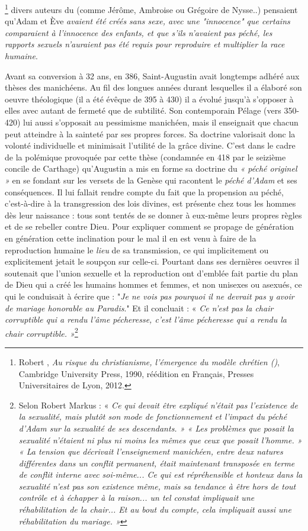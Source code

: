 \footnote{Robert , \emph{Au risque du christianisme, l'émergence du modèle chrétien ()}, Cambridge University Press, 1990, réédition en Français, Presses Universitaires de Lyon, 2012.} 
divers auteurs du  (comme Jérôme, Ambroise ou Grégoire de Nysse..) pensaient qu'Adam et Ève \emph{avaient été créés sans sexe, avec une "innocence" que certains comparaient à l'innocence des enfants, et que s'ils n'avaient pas péché, les rapports sexuels n'auraient pas été requis pour reproduire et multiplier la race humaine}.

 Avant sa conversion à 32 ans, en 386, Saint-Augustin avait longtemps adhéré aux thèses des manichéens. Au fil des longues années durant lesquelles il a élaboré son oeuvre théologique (il a été évêque de 395 à 430) il a évolué jusqu'à s'opposer à elles avec autant de fermeté que de subtilité. Son contemporain Pélage (vers 350-420) lui aussi s'opposait au pessimisme manichéen, mais il enseignait que chacun peut atteindre à la sainteté par ses propres forces. Sa doctrine valorisait donc la volonté individuelle et minimisait l'utilité de la grâce divine. C'est dans le cadre de la polémique provoquée par cette thèse (condamnée en 418 par le seizième concile de Carthage) qu'Augustin a mis en forme sa doctrine du \emph{« péché originel »} en se fondant sur les versets de la Genèse qui racontent le \emph{péché d'Adam} et ses conséquences. Il lui fallait rendre compte du fait que la propension au péché, c'est-à-dire à la transgression des lois divines, est présente chez tous les hommes dès leur naissance : tous sont tentés de se donner à eux-même leurs propres règles et de se rebeller contre Dieu. Pour expliquer comment se propage de génération en génération cette inclination pour le mal il en est venu à faire de la reproduction humaine le \emph{lieu} de sa transmission, ce qui implicitement ou explicitement jetait le soupçon sur celle-ci. Pourtant dans ses dernières oeuvres il soutenait que l'union sexuelle et la reproduction ont d'emblée fait partie du plan de Dieu qui a créé les humains hommes et femmes, et non unisexes ou asexués, ce qui le conduisait à écrire que : "\emph{Je ne vois pas pourquoi il ne devrait pas y avoir de mariage honorable au Paradis}." Et il concluait : « \emph{Ce n'est pas la chair corruptible qui a rendu l'âme pécheresse, c'est l'âme pécheresse qui a rendu la chair corruptible. »}\footnote{Selon Robert Markus :  «\emph{ Ce qui devait être expliqué n'était pas l'existence de la sexualité, mais plutôt son mode de fonctionnement et l'impact du péché d'Adam sur la sexualité de ses descendants. » « Les problèmes que posait la sexualité n'étaient ni plus ni moins les mêmes que ceux que posait l'homme. »  « La tension que décrivait l'enseignement manichéen, entre deux natures différentes dans un conflit permanent, était maintenant transposée en terme de conflit interne avec soi-même... Ce qui est répréhensible et honteux dans la sexualité n'est pas son existence même, mais sa tendance à être hors de tout contrôle et à échapper à la raison... un tel constat impliquait une réhabilitation de la chair... Et au bout du compte, cela impliquait aussi une réhabilitation du mariage. »}} 
 
